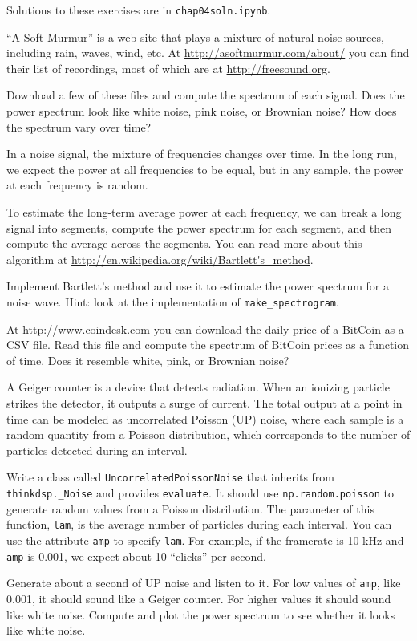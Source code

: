 Solutions to these exercises are in {\tt chap04soln.ipynb}.

\begin{exercise}
	``A Soft Murmur'' is a web site that plays a mixture of natural
	noise sources, including rain, waves, wind, etc.  At
	\url{http://asoftmurmur.com/about/} you can find their list
	of recordings, most of which are at \url{http://freesound.org}.
	
	Download a few of these files and compute the spectrum of each
	signal.  Does the power spectrum look like white noise, pink noise,
	or Brownian noise?  How does the spectrum vary over time?
\end{exercise}


\begin{exercise}
	In a noise signal, the mixture of frequencies changes over time.
	In the long run, we expect the power at all frequencies to be equal,
	but in any sample, the power at each frequency is random.
	
	To estimate the long-term average power at each frequency, we can
	break a long signal into segments, compute the power spectrum
	for each segment, and then compute the average across
	the segments.  You can read more about this algorithm at
	\url{http://en.wikipedia.org/wiki/Bartlett's_method}.
	
	Implement Bartlett's method and use it to estimate the power
	spectrum for a noise wave.  Hint: look at the implementation
	of \verb"make_spectrogram".
\end{exercise}


\begin{exercise}
	At \url{http://www.coindesk.com} you can download the daily
	price of a BitCoin as a CSV file.  Read this file and compute
	the spectrum of BitCoin prices as a function of time.
	Does it resemble white, pink, or Brownian noise?
\end{exercise}


\begin{exercise}
	A Geiger counter is a device that detects radiation.
	When an ionizing particle strikes the detector, it outputs a surge of
	current.  The total output at a point in time can be modeled as
	uncorrelated Poisson (UP) noise, where each sample is
	a random quantity from a Poisson distribution, which corresponds to the
	number of particles detected during an interval.
	
	Write a class called {\tt UncorrelatedPoissonNoise} that inherits
	from \verb"thinkdsp._Noise" and provides {\tt evaluate}.  It should
	use {\tt np.random.poisson} to generate random values from a Poisson
	distribution.  The parameter of this function, {\tt lam}, is the
	average number of particles during each interval.  You can use the
	attribute {\tt amp} to specify {\tt lam}.  For example, if the
	framerate is 10 kHz and {\tt amp} is 0.001, we expect about 10
	``clicks'' per second.
	
	Generate about a second of UP noise and listen to it.  For low values
	of {\tt amp}, like 0.001, it should sound like a Geiger counter.  For
	higher values it should sound like white noise.  Compute and plot the
	power spectrum to see whether it looks like white noise.
\end{exercise}


